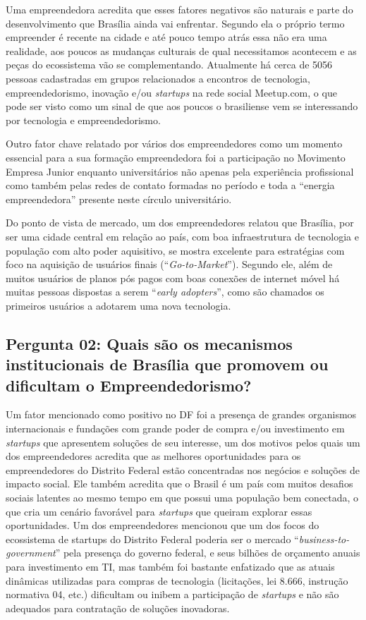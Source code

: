 Uma empreendedora acredita que esses fatores negativos são naturais e parte do desenvolvimento que Brasília ainda vai enfrentar. Segundo ela o próprio termo empreender é recente na cidade e até pouco tempo atrás essa não era uma realidade, aos poucos as mudanças culturais de qual necessitamos acontecem e as peças do ecossistema vão se complementando. Atualmente há cerca de 5056 pessoas cadastradas em grupos relacionados a encontros de tecnologia, empreendedorismo, inovação e/ou \textit{startups} na rede social Meetup.com, o que pode ser visto como um sinal de que aos poucos o brasiliense vem se interessando por tecnologia e empreendedorismo.

Outro fator chave relatado por vários dos empreendedores como um momento essencial para a sua formação empreendedora foi a participação no Movimento Empresa Junior enquanto universitários não apenas pela experiência profissional como também pelas redes de contato formadas no período e toda a ``energia empreendedora'' presente neste círculo universitário. 

Do ponto de vista de mercado, um dos empreendedores relatou que Brasília, por ser uma cidade central em relação ao país, com boa infraestrutura de tecnologia e população com alto poder aquisitivo, se mostra excelente para estratégias com foco na aquisição de usuários finais (``\textit{Go-to-Market}''). Segundo ele, além de muitos usuários de planos pós pagos com boas conexões de internet móvel há muitas pessoas dispostas a serem ``\textit{early adopters}'', como são chamados os primeiros usuários a adotarem uma nova tecnologia.

\subsection*{Pergunta 02: Quais são os mecanismos institucionais de Brasília que promovem ou dificultam o Empreendedorismo?}
\label{subsection:pergunta_de_pesquisa_2}

Um fator mencionado como positivo no DF foi a presença de grandes organismos internacionais e fundações com grande poder de compra e/ou investimento em \textit{startups} que apresentem soluções de seu interesse, um dos motivos pelos quais um dos empreendedores acredita que as melhores oportunidades para os empreendedores do Distrito Federal estão concentradas nos negócios e soluções de impacto social. Ele também acredita que o Brasil é um país com muitos desafios sociais latentes ao mesmo tempo em que possui uma população bem conectada, o que cria um cenário favorável para \textit{startups} que queiram explorar essas oportunidades. Um dos empreendedores mencionou que um dos focos do ecossistema de startups do Distrito Federal poderia ser o mercado ``\textit{business-to-government}'' pela presença do governo federal, e seus bilhões de orçamento anuais para investimento em TI, mas também foi bastante enfatizado que as atuais dinâmicas utilizadas para compras de tecnologia (licitações, lei 8.666, instrução normativa 04, etc.) dificultam ou inibem a participação de \textit{startups} e não são adequados para contratação de soluções inovadoras. 

